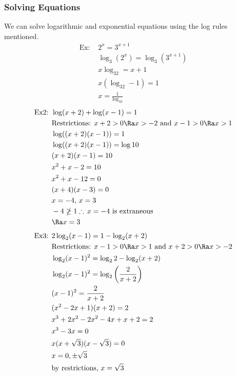 \subsubsection{Solving Equations}
We can solve logarithmic and exponential equations using the log rules mentioned.
\begin{align*}
    \text{Ex: }&2^x=3^{x+1}\\
    &\log_3(2^x)=\log_3(3^{x+1})\\
    &x\log_32=x+1\\
    &x(\log_32-1)=1\\
    &x=\frac{1}{\log_32}
\end{align*}
\begin{align*}
    \text{Ex2: }&\log(x+2)+\log(x-1)=1\\
    &\text{Restrictions: }x+2>0\Ra x>-2\text{ and }x-1>0\Ra x>1\\
    &\log((x+2)(x-1))=1\\
    &\log((x+2)(x-1))=\log10\\
    &(x+2)(x-1)=10\\
    &x^2+x-2=10\\
    &x^2+x-12=0\\
    &(x+4)(x-3)=0\\
    &x=-4,\,x=3\\
    &-4\ngeq 1\therefore\,x=-4\text{ is extraneous}\\
    &\Ra x=3
\end{align*}
\begin{align*}
    \text{Ex3: }&2\log_2(x-1)=1-\log_2(x+2)\\
    &\text{Restrictions: }x-1>0\Ra x>1\text{ and }x+2>0\Ra x>-2\\
    &\log_2(x-1)^2=\log_22-\log_2(x+2)\\
    &\log_2(x-1)^2=\log_2\left(\frac{2}{x+2}\right)\\
    &(x-1)^2=\frac{2}{x+2}\\
    &(x^2-2x+1)(x+2)=2\\
    &x^3+2x^2-2x^2-4x+x+2=2\\
    &x^3-3x=0\\
    &x(x+\sqrt{3})(x-\sqrt{3})=0\\
    &x=0,\pm\sqrt{3}\\
    &\text{by restrictions, }x=\sqrt{3}
\end{align*}

